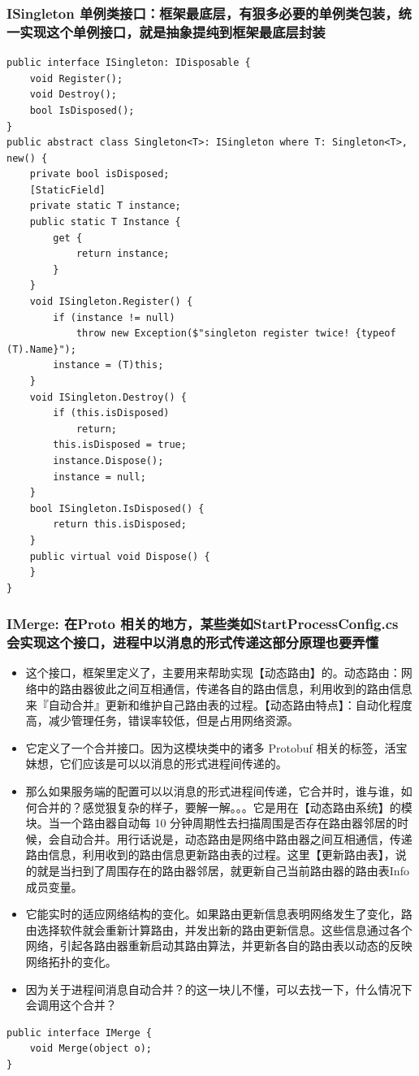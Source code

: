 \documentclass[9pt, b5paper]{article}
\begin{document}
\subsubsection{ISingleton 单例类接口：框架最底层，有狠多必要的单例类包装，统一实现这个单例接口，就是抽象提纯到框架最底层封装}
\label{sec-1-3-3}
\begin{verbatim}
public interface ISingleton: IDisposable {
    void Register();
    void Destroy();
    bool IsDisposed();
}
public abstract class Singleton<T>: ISingleton where T: Singleton<T>, new() {
    private bool isDisposed;
    [StaticField]
    private static T instance;
    public static T Instance {
        get {
            return instance;
        }
    }
    void ISingleton.Register() {
        if (instance != null) 
            throw new Exception($"singleton register twice! {typeof (T).Name}");
        instance = (T)this;
    }
    void ISingleton.Destroy() {
        if (this.isDisposed) 
            return;
        this.isDisposed = true;
        instance.Dispose();
        instance = null;
    }
    bool ISingleton.IsDisposed() {
        return this.isDisposed;
    }
    public virtual void Dispose() {
    }
}
\end{verbatim}
\subsubsection{IMerge: 在Proto 相关的地方，某些类如StartProcessConfig.cs 会实现这个接口，进程中以消息的形式传递这部分原理也要弄懂}
\label{sec-1-3-4}
\begin{itemize}
\item 这个接口，框架里定义了，主要用来帮助实现【动态路由】的。动态路由：网络中的路由器彼此之间互相通信，传递各自的路由信息，利用收到的路由信息来『自动合并』更新和维护自己路由表的过程。【动态路由特点】：自动化程度高，减少管理任务，错误率较低，但是占用网络资源。
\item 它定义了一个合并接口。因为这模块类中的诸多 Protobuf 相关的标签，活宝妹想，它们应该是可以以消息的形式进程间传递的。
\item 那么如果服务端的配置可以以消息的形式进程间传递，它合并时，谁与谁，如何合并的？感觉狠复杂的样子，要解一解。。。它是用在【动态路由系统】的模块。当一个路由器自动每 10 分钟周期性去扫描周围是否存在路由器邻居的时候，会自动合并。用行话说是，动态路由是网络中路由器之间互相通信，传递路由信息，利用收到的路由信息更新路由表的过程。这里【更新路由表】，说的就是当扫到了周围存在的路由器邻居，就更新自己当前路由器的路由表Info 成员变量。
\item 它能实时的适应网络结构的变化。如果路由更新信息表明网络发生了变化，路由选择软件就会重新计算路由，并发出新的路由更新信息。这些信息通过各个网络，引起各路由器重新启动其路由算法，并更新各自的路由表以动态的反映网络拓扑的变化。
\item 因为关于进程间消息自动合并？的这一块儿不懂，可以去找一下，什么情况下会调用这个合并？
\end{itemize}
\begin{verbatim}
public interface IMerge {
    void Merge(object o);
}
\end{verbatim}
\end{document}
